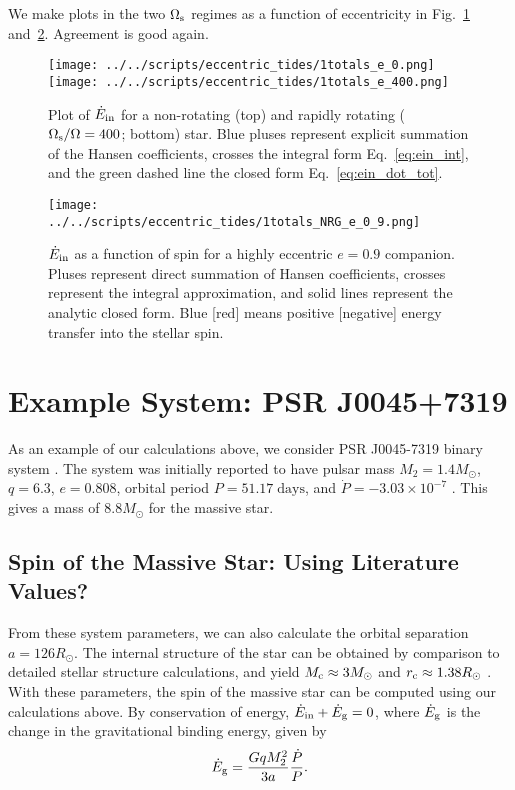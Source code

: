 \documentclass[
        fleqn,
        usenatbib,
    ]{mnras}
\begin{document}
We make plots in the two $\Omega_{\rm s}$ regimes as a function of eccentricity in
Fig.~\ref{fig:e0} and~\ref{fig:e_spin}. Agreement is good again.
\begin{figure}
    \centering
    \texttt{[image: ../../scripts/eccentric\_tides/1totals\_e\_0.png]}
    \texttt{[image: ../../scripts/eccentric\_tides/1totals\_e\_400.png]}
    \caption{Plot of $\dot{E}_{\rm in}$ for a non-rotating (top) and rapidly
    rotating ($\Omega_{\rm s} / \Omega = 400$; bottom) star. Blue pluses
    represent explicit summation of the Hansen coefficients, crosses the
    integral form Eq.~\eqref{eq:ein_int}, and the green dashed line the closed
    form Eq.~\eqref{eq:ein_dot_tot}.}\label{fig:e0}
\end{figure}
\begin{figure}
    \centering
    \texttt{[image: ../../scripts/eccentric\_tides/1totals\_NRG\_e\_0\_9.png]}
    \caption{$\dot{E}_{\rm in}$ as a function of spin for a highly eccentric $e
    = 0.9$ companion. Pluses represent direct summation of Hansen coefficients,
    crosses represent the integral approximation, and solid lines represent
    the analytic closed form. Blue [red] means positive [negative]
    energy transfer into the stellar spin.}\label{fig:e_spin}
\end{figure}

\section{Example System: PSR J0045+7319}\label{s:j00457319}

As an example of our calculations above, we consider PSR J0045-7319 binary
system \citep{bell1995psr}. The system was initially reported to have pulsar
mass $M_2 = 1.4M_{\odot}$, $q = 6.3$, $e = 0.808$, orbital period $P =
51.17\;\mathrm{days}$, and $\dot{P} = -3.03\times 10^{-7}$
\citep{kaspi1996params}. This gives a mass of $8.8M_{\odot}$ for the massive
star.

\subsection{Spin of the Massive Star: Using Literature Values?}

From these system parameters, we can also calculate the orbital separation $a =
126R_{\odot}$. The internal structure of the star can be obtained by comparison
to detailed stellar structure calculations, and yield $M_{\rm c} \approx
3M_{\odot}$ and $r_{\rm c} \approx 1.38R_{\odot}$ \citep{kumar1998}. With these
parameters, the spin of the massive star can be computed using our calculations
above. By conservation of energy, $\dot{E}_{\rm in} + \dot{E}_{\rm g} = 0$,
where $\dot{E}_{\rm g}$ is the change in the gravitational binding energy, given
by
\begin{equation}
    \dot{E}_{\rm g} = \frac{GqM_2^2}{3a}\frac{\dot{P}}{P}.
\end{equation}
\end{document}
